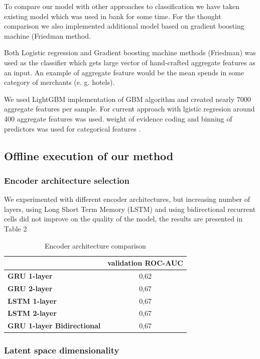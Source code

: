 \documentclass{sigkddExp}
\begin{document}
To compare our model with other approaches to classification we have taken existing model which was used in bank for some time. For the thought comparison we also implemented additional model based on gradient boosting machine (Friedman\cite{friedman2001greedy} method.

Both Logistic regression  and Gradient boosting machine methods (Friedman\cite{friedman2001greedy}) was used as the classifier which gets large vector of hand-crafted aggregate features as an input. An example of aggregate feature would be the mean spends in some category of merchants (e. g. hotels).

We used LightGBM\cite{Ke2017LightGBMAH} implementation of GBM algorithm and created nearly 7000 aggregate features per sample. For current approach with lgistic regresion around 400 aggregate features was used. weight of evidence coding and binning of predictors was used for categorical features
\cite{lund2016woe}. 

\subsection{Offline execution of our method}

\subsubsection{Encoder architecture selection}

We experimented with different encoder architectures, but increasing number of layers, using Long Short Term Memory (LSTM) and using bidirectional recurrent cells did not improve on the quality of the model, the results are presented in Table 2

\begin{table}
\caption{Encoder architecture comparison}
\begin{tabular}{ | l | c |  }
\hline
& \textbf{validation ROC-AUC} \\
\hline
\textbf{GRU 1-layer} & 0,62  \\
\textbf{GRU 2-layer} & 0,67  \\
\textbf{LSTM 1-layer} & 0,67  \\
\textbf{LSTM 2-layer} & 0,67  \\
\textbf{GRU 1-layer Bidirectional} & 0,67  \\
\hline
\end{tabular}
\label{tab3}
\end{table}


\subsubsection{Latent space dimensionality}
\end{document}
